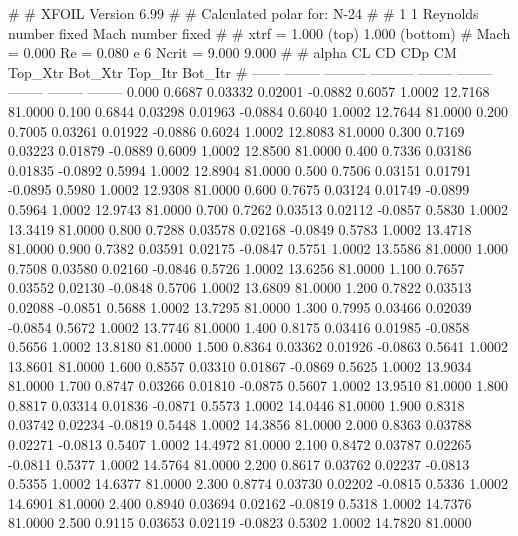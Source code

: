#  
#       XFOIL         Version 6.99
#  
# Calculated polar for: N-24                                            
#  
# 1 1 Reynolds number fixed          Mach number fixed         
#  
# xtrf =   1.000 (top)        1.000 (bottom)  
# Mach =   0.000     Re =     0.080 e 6     Ncrit =   9.000  9.000
#  
#   alpha    CL        CD       CDp       CM     Top_Xtr  Bot_Xtr  Top_Itr  Bot_Itr
#  ------ -------- --------- --------- -------- -------- -------- -------- --------
   0.000   0.6687   0.03332   0.02001  -0.0882   0.6057   1.0002  12.7168  81.0000
   0.100   0.6844   0.03298   0.01963  -0.0884   0.6040   1.0002  12.7644  81.0000
   0.200   0.7005   0.03261   0.01922  -0.0886   0.6024   1.0002  12.8083  81.0000
   0.300   0.7169   0.03223   0.01879  -0.0889   0.6009   1.0002  12.8500  81.0000
   0.400   0.7336   0.03186   0.01835  -0.0892   0.5994   1.0002  12.8904  81.0000
   0.500   0.7506   0.03151   0.01791  -0.0895   0.5980   1.0002  12.9308  81.0000
   0.600   0.7675   0.03124   0.01749  -0.0899   0.5964   1.0002  12.9743  81.0000
   0.700   0.7262   0.03513   0.02112  -0.0857   0.5830   1.0002  13.3419  81.0000
   0.800   0.7288   0.03578   0.02168  -0.0849   0.5783   1.0002  13.4718  81.0000
   0.900   0.7382   0.03591   0.02175  -0.0847   0.5751   1.0002  13.5586  81.0000
   1.000   0.7508   0.03580   0.02160  -0.0846   0.5726   1.0002  13.6256  81.0000
   1.100   0.7657   0.03552   0.02130  -0.0848   0.5706   1.0002  13.6809  81.0000
   1.200   0.7822   0.03513   0.02088  -0.0851   0.5688   1.0002  13.7295  81.0000
   1.300   0.7995   0.03466   0.02039  -0.0854   0.5672   1.0002  13.7746  81.0000
   1.400   0.8175   0.03416   0.01985  -0.0858   0.5656   1.0002  13.8180  81.0000
   1.500   0.8364   0.03362   0.01926  -0.0863   0.5641   1.0002  13.8601  81.0000
   1.600   0.8557   0.03310   0.01867  -0.0869   0.5625   1.0002  13.9034  81.0000
   1.700   0.8747   0.03266   0.01810  -0.0875   0.5607   1.0002  13.9510  81.0000
   1.800   0.8817   0.03314   0.01836  -0.0871   0.5573   1.0002  14.0446  81.0000
   1.900   0.8318   0.03742   0.02234  -0.0819   0.5448   1.0002  14.3856  81.0000
   2.000   0.8363   0.03788   0.02271  -0.0813   0.5407   1.0002  14.4972  81.0000
   2.100   0.8472   0.03787   0.02265  -0.0811   0.5377   1.0002  14.5764  81.0000
   2.200   0.8617   0.03762   0.02237  -0.0813   0.5355   1.0002  14.6377  81.0000
   2.300   0.8774   0.03730   0.02202  -0.0815   0.5336   1.0002  14.6901  81.0000
   2.400   0.8940   0.03694   0.02162  -0.0819   0.5318   1.0002  14.7376  81.0000
   2.500   0.9115   0.03653   0.02119  -0.0823   0.5302   1.0002  14.7820  81.0000
